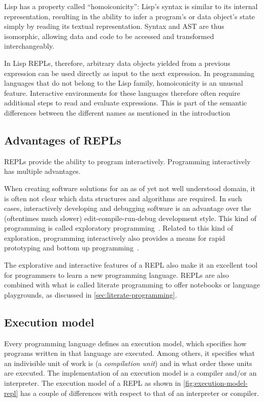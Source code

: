Lisp has a property called ``homoiconicity'': Lisp's syntax is similar to
its internal representation, resulting in the ability to infer a program's or
data object's state simply by reading its textual representation. Syntax and AST
are thus isomorphic, allowing data and code to be accessed and transformed
interchangeably.

In Lisp REPLs, therefore, arbitrary data objects yielded from a previous
expression can be used directly as input to the next expression. In programming
languages that do not belong to the Lisp family, homoiconicity is an unusual
feature. Interactive environments for these languages therefore often require
additional steps to read and evaluate expressions. This is part of the semantic
differences between the different names as mentioned in the introduction

\subsection{Advantages of REPLs}
\label{ssec:repl-advantages}

REPLs provide the ability to program interactively. Programming interactively
has multiple advantages.

When creating software solutions for an as of yet not well understood domain, it
is often not clear which data structures and algorithms are required. In such
cases, interactively developing and debugging software is an advantage over the
(oftentimes much slower) edit-compile-run-debug development style. This kind of
programming is called exploratory programming~\cite{Fritzson86}. Related to this
kind of exploration, programming interactively also provides a means for rapid
prototyping and bottom up programming~\cite{Graham93}.

The explorative and interactive features of a REPL also make it an excellent
tool for programmers to learn a new programming language. REPLs are also
combined with what is called literate programming to offer notebooks or language
playgrounds, as discussed in \cref{sec:literate-programming}.

\subsection{Execution model}
\label{ssec:execution-model}

Every programming language defines an execution model, which specifies how
programs written in that language are executed. Among others, it specifies what
an indivisible unit of work is (a \emph{compilation unit}) and in what order
these units are executed. The implementation of an execution model is a compiler
and/or an interpreter. The execution model of a REPL as shown in
\cref{fig:execution-model-repl} has a couple of differences with respect to that
of an interpreter or compiler.

